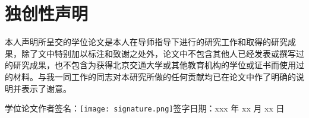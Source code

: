  \setlength{\baselineskip}{16pt}
\chapter{独创性声明}




 
\hspace{2em}本人声明所呈交的学位论文是本人在导师指导下进行的研究工作和取得的研究成果，除了文中特别加以标注和致谢之处外，论文中不包含其他人已经发表或撰写过的研究成果，也不包含为获得北京交通大学或其他教育机构的学位或证书而使用过的材料。与我一同工作的同志对本研究所做的任何贡献均已在论文中作了明确的说明并表示了谢意。



\vspace{72pt}
 
\hspace{2em}学位论文作者签名：\hspace{1.5em}\texttt{[image: signature.png]}\hspace{4em}签字日期：xxx 年 xx 月 xx 日 

